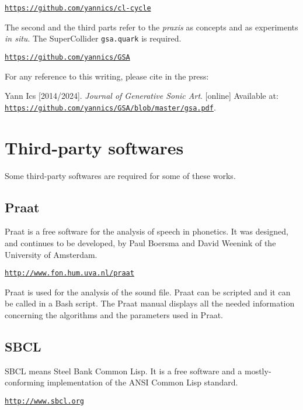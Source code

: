 \href{https://github.com/yannics/cl-cycle}{\texttt{\small https://github.com/yannics/cl-cycle}}

\newpage
The second and the third parts refer to the \textit{praxis} as concepts and as experiments \textit{in situ}. The SuperCollider \texttt{gsa.quark} is required.

\href{https://github.com/yannics/GSA}{\texttt{\small https://github.com/yannics/GSA}}

\bigskip

For any reference to this writing, please cite in the press: 

\noindent Yann Ics [2014/2024]. \textit{Journal of Generative Sonic Art}. [online] Available at: \href{https://github.com/yannics/GSA/blob/master/gsa.pdf}{\texttt{\small https://github.com/yannics/GSA/blob/master/gsa.pdf}}.

\section*{Third-party softwares}
\label{tps}

Some third-party softwares are required for some of these works. 

\subsection*{Praat}

Praat is a free software for the analysis of speech in phonetics. It was designed, and continues to be developed, by Paul Boersma and David Weenink of the University of Amsterdam. 

\href{http://www.fon.hum.uva.nl/praat}{\texttt{\small http://www.fon.hum.uva.nl/praat}}

\bigskip

Praat is used for the analysis of the sound file. Praat can be scripted and it can be called in a Bash script. The Praat manual displays all the needed information concerning the algorithms and the parameters used in Praat.

\subsection*{SBCL}

SBCL means Steel Bank Common Lisp. It is a free software and a mostly-conforming implementation of the ANSI Common Lisp standard.

\href{http://www.sbcl.org}{\texttt{\small http://www.sbcl.org}}

